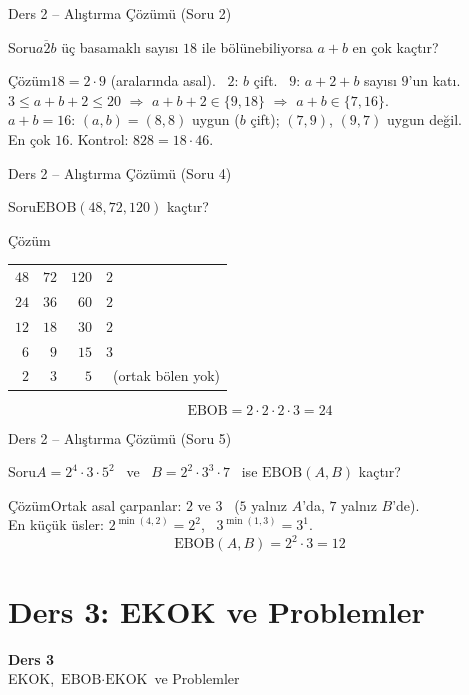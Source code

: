 \documentclass[aspectratio=169,11pt]{beamer}
\newcommand{\soru}[3]{%
\begin{frame}{#1}
  \begin{block}{Soru}\large #2\end{block}
  \pause
  \begin{exampleblock}{Çözüm}\large #3\end{exampleblock}
\end{frame}}
\newcommand{\ab}[1]{\overline{#1}}
\begin{document}
\soru{Ders 2 -- Alıştırma Çözümü (Soru 2)}
{\(\ab{a2b}\) üç basamaklı sayısı \(18\) ile bölünebiliyorsa \(a+b\) en çok kaçtır?}
{\(18=2\cdot 9\) (aralarında asal). \ \(2\): \(b\) çift. \ \(9\): \(a+2+b\) sayısı \(9\)'un katı.\\[3pt]
\(3\le a+b+2\le 20\) \(\Rightarrow\) \(a+b+2\in\{9,18\}\) \(\Rightarrow\) \(a+b\in\{7,16\}\).\\[3pt]
\(a+b=16\): \((a,b)=(8,8)\) uygun (\(b\) çift); \((7,9)\), \((9,7)\) uygun değil.\\[3pt]
En çok \(16\). \quad Kontrol: \(828=18\cdot 46\).}

\soru{Ders 2 -- Alıştırma Çözümü (Soru 4)}
{\(\text{EBOB}(48,72,120)\) kaçtır?}
{{\normalsize
\begin{tabular}{rrr|l}
\(48\) & \(72\) & \(120\) & \(2\)\\
\(24\) & \(36\) & \(60\) & \(2\)\\
\(12\) & \(18\) & \(30\) & \(2\)\\
\(6\) & \(9\) & \(15\) & \(3\)\\
\(2\) & \(3\) & \(5\) & \ (ortak bölen yok)
\end{tabular}}
\[\text{EBOB}=2\cdot 2\cdot 2\cdot 3=24\]}

\soru{Ders 2 -- Alıştırma Çözümü (Soru 5)}
{\(A=2^4\cdot 3\cdot 5^2\) \ ve \ \(B=2^2\cdot 3^3\cdot 7\) \ ise \(\text{EBOB}(A,B)\) kaçtır?}
{Ortak asal çarpanlar: \(2\) ve \(3\) \ (\(5\) yalnız \(A\)'da, \(7\) yalnız \(B\)'de).\\[3pt]
En küçük üsler: \(2^{\min(4,2)}=2^2\), \ \(3^{\min(1,3)}=3^1\).
\[\text{EBOB}(A,B)=2^2\cdot 3=12\]}

\section{Ders 3: EKOK ve Problemler}
\begin{frame}
\centering\Large\color{anamavi}\textbf{Ders 3}\\[6pt]\normalsize EKOK, \(\text{EBOB}\cdot\text{EKOK}\) ve Problemler
\end{frame}
\end{document}
